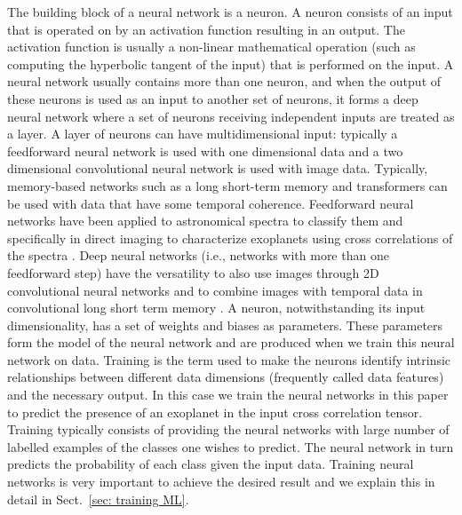 \documentclass{aa}
\begin{document}
The building block of a neural network is a neuron.
A neuron consists of an input that is operated on by an activation function resulting in an output.
The activation function is usually a non-linear mathematical operation (such as computing the hyperbolic tangent of the input) that is performed on the input.
A neural network usually contains more than one neuron, and when the output of these neurons is used as an input to another set of neurons, it forms a deep neural network where a set of neurons receiving independent inputs are treated as a layer.
A layer of neurons can have multidimensional input: typically a feedforward neural network is used with one dimensional data and a two dimensional convolutional neural network is used with image data.
Typically, memory-based networks such as a long short-term memory and transformers can be used with data that have some temporal coherence.
Feedforward neural networks have been applied to astronomical spectra \citep[e.g.,][]{2019Leung,2020Tao} to classify them and specifically in direct imaging to characterize exoplanets using cross correlations of the spectra \citep{2020Fisher}.
Deep neural networks (i.e., networks with more than one feedforward step) have the versatility to also use images through 2D convolutional neural networks \citep[CNN,][]{shi2015convolutional} and to combine images with temporal data in convolutional long short term memory \citep[convLSTM,][]{1997HocherieterLSTM,2022convLSTM}.
A neuron, notwithstanding its input dimensionality, has a set of weights and biases as parameters. 
These parameters form the model of the neural network and are produced when we train this neural network on data.
Training is the term used to make the neurons identify intrinsic relationships between different data dimensions (frequently called data features) and the necessary output.
In this case we train the neural networks in this paper to predict the presence of an exoplanet in the input cross correlation tensor.
Training typically consists of providing the neural networks with large number of labelled examples of the classes one wishes to predict.
The neural network in turn predicts the probability of each class given the input data.
Training neural networks is very important to achieve the desired result and we explain this in detail in Sect.~\ref{sec: training ML}.
\end{document}
